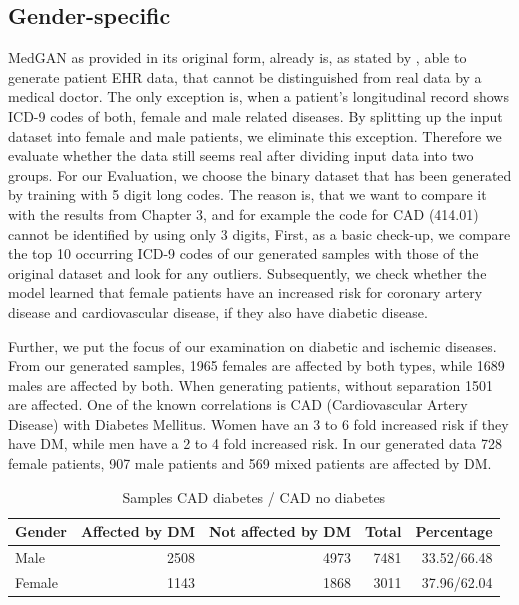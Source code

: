 \documentclass[11pt, a4paper, oneside]{book}
\begin{document}
\subsection{Gender-specific}
MedGAN as provided in its original form, already is, as stated by \citep{Choi2017}, able to generate patient EHR data, that cannot be distinguished from real data by a medical doctor. The only exception is, when a patient's longitudinal record shows ICD-9 codes of both, female and male related diseases.  \citep{Choi2017}
By splitting up the input dataset into female and male patients, we eliminate this exception. Therefore we evaluate whether the data still seems real after dividing input data into two groups. For our Evaluation, we choose the binary dataset that has been generated by training with 5 digit long codes. The reason is, that we want to compare it with the results from Chapter 3, and for example the code for CAD (414.01) cannot be identified by using only 3 digits,
First, as a basic check-up, we compare the top 10 occurring ICD-9 codes of our generated samples with those of the original dataset and look for any outliers. Subsequently, we check whether the model learned that female patients have an increased risk for coronary artery disease and cardiovascular disease, if they also have diabetic disease. 

Further, we put the focus of our examination on diabetic and ischemic diseases. 
From our generated samples, 1965 females are affected by both types, while 1689 males are affected by both. When generating patients, without separation 1501 are affected.
One of the known correlations is CAD (Cardiovascular Artery Disease) with Diabetes Mellitus. Women have an 3 to 6 fold increased risk if they have DM, while men have a 2 to 4 fold increased risk. \citep{juutilainen2004gender}
In our generated data 728 female patients, 907 male patients and 569 mixed patients are affected by DM.

\begin{table}
\begin{tabularx}{\textwidth}{X|r|r|r|r}
\textbf{Gender} & \textbf{Affected by DM} & \textbf{Not affected by DM} & \textbf{Total} & \textbf{Percentage}\\
\hline
Male 	& 2508 & 4973 & 7481 & 33.52/66.48\\
Female & 1143 & 1868 & 3011 & 37.96/62.04\\
\end{tabularx}
\caption{\label{tab:cad-diabetic-synth}Samples CAD diabetes / CAD no diabetes}
\end{table}
\end{document}
